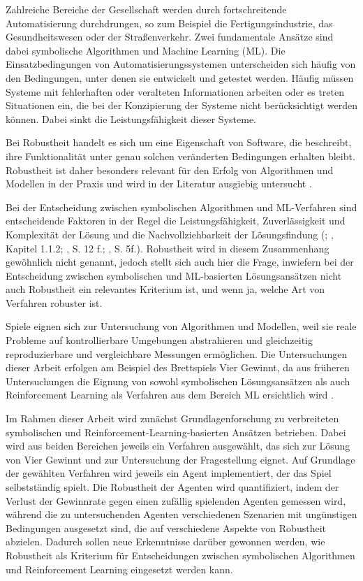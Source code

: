 Zahlreiche Bereiche der Gesellschaft werden durch fortschreitende Automatisierung durchdrungen, so zum Beispiel die Fertigungsindustrie, das Gesundheitswesen oder der Straßenverkehr. Zwei fundamentale Ansätze sind dabei symbolische Algorithmen und Machine Learning (ML). Die Einsatzbedingungen von Automatisierungssystemen unterscheiden sich häufig von den Bedingungen, unter denen sie entwickelt und getestet werden. Häufig müssen Systeme mit fehlerhaften oder veralteten Informationen arbeiten oder es treten Situationen ein, die bei der Konzipierung der Systeme nicht berücksichtigt werden können. Dabei sinkt die Leistungsfähigkeit dieser Systeme.

Bei Robustheit handelt es sich um eine Eigenschaft von Software, die beschreibt, ihre Funktionalität unter genau solchen veränderten Bedingungen erhalten bleibt. Robustheit ist daher besonders relevant für den Erfolg von Algorithmen und Modellen in der Praxis und wird in der Literatur ausgiebig untersucht \cite{Micskei.2012} \cite{Moos.2022} \cite{Ni.2021}.

Bei der Entscheidung zwischen symbolischen Algorithmen und ML-Verfahren sind entscheidende Faktoren in der Regel die Leistungsfähigkeit, Zuverlässigkeit und Komplexität der Lösung und die Nachvollziehbarkeit der Lösungsfindung (\cite{Dabas.2022}; \cite{Ferguson.January2019}, Kapitel 1.1.2; \cite{Humm.2020}, S. 12 f.; \cite{Früh.2022}, S. 5f.). Robustheit wird in diesem Zusammenhang gewöhnlich nicht genannt, jedoch stellt sich auch hier die Frage, inwiefern bei der Entscheidung zwischen symbolischen und ML-basierten Lösungsansätzen nicht auch Robustheit ein relevantes Kriterium ist, und wenn ja, welche Art von Verfahren robuster ist.

Spiele eignen sich zur Untersuchung von Algorithmen und Modellen, weil sie reale Probleme auf kontrollierbare Umgebungen abstrahieren und gleichzeitig reproduzierbare und vergleichbare Messungen ermöglichen. Die Untersuchungen dieser Arbeit erfolgen am Beispiel des Brettspiels Vier Gewinnt, da aus früheren Untersuchungen die Eignung von sowohl symbolischen Lösungsansätzen als auch Reinforcement Learning als Verfahren aus dem Bereich ML ersichtlich wird \cite{Qiu.2022} \cite{Sheoran.2022} \cite{Taylor.2024} \cite{Dabas.2022} \cite{Wäldchen.2022}.

Im Rahmen dieser Arbeit wird zunächst Grundlagenforschung zu verbreiteten symbolischen und Reinforcement-Learning-basierten Ansätzen betrieben. Dabei wird aus beiden Bereichen jeweils ein Verfahren ausgewählt, das sich zur Lösung von Vier Gewinnt und zur Untersuchung der Fragestellung eignet. Auf Grundlage der gewählten Verfahren wird jeweils ein Agent implementiert, der das Spiel selbstständig spielt. Die Robustheit der Agenten wird quantifiziert, indem der Verlust der Gewinnrate gegen einen zufällig spielenden Agenten gemessen wird, während die zu untersuchenden Agenten verschiedenen Szenarien mit ungünstigen Bedingungen ausgesetzt sind, die auf verschiedene Aspekte von Robustheit abzielen. Dadurch sollen neue Erkenntnisse darüber gewonnen werden, wie Robustheit als Kriterium für Entscheidungen zwischen symbolischen Algorithmen und Reinforcement Learning eingesetzt werden kann.
